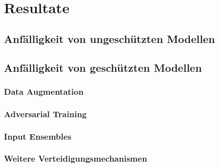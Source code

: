 \section{Resultate}

\subsection{Anfälligkeit von ungeschützten Modellen}

\subsection{Anfälligkeit von geschützten Modellen}

\subsubsection{Data Augmentation}

\subsubsection{Adversarial Training}

\subsubsection{Input Ensembles}

\subsubsection{Weitere Verteidigungsmechanismen}